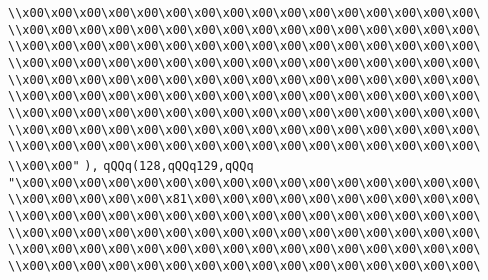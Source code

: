 \verb|\\x00\x00\x00\x00\x00\x00\x00\x00\x00\x00\x00\x00\x00\x00\x00\x00\|\newline
\verb|\\x00\x00\x00\x00\x00\x00\x00\x00\x00\x00\x00\x00\x00\x00\x00\x00\|\newline
\verb|\\x00\x00\x00\x00\x00\x00\x00\x00\x00\x00\x00\x00\x00\x00\x00\x00\|\newline
\verb|\\x00\x00\x00\x00\x00\x00\x00\x00\x00\x00\x00\x00\x00\x00\x00\x00\|\newline
\verb|\\x00\x00\x00\x00\x00\x00\x00\x00\x00\x00\x00\x00\x00\x00\x00\x00\|\newline
\verb|\\x00\x00\x00\x00\x00\x00\x00\x00\x00\x00\x00\x00\x00\x00\x00\x00\|\newline
\verb|\\x00\x00\x00\x00\x00\x00\x00\x00\x00\x00\x00\x00\x00\x00\x00\x00\|\newline
\verb|\\x00\x00\x00\x00\x00\x00\x00\x00\x00\x00\x00\x00\x00\x00\x00\x00\|\newline
\verb|\\x00\x00\x00\x00\x00\x00\x00\x00\x00\x00\x00\x00\x00\x00\x00\x00\|\newline
\verb|\\x00\x00"|\newline
\verb|),|\newline
\verb|qQQq(128,qQQq129,qQQq|\newline
\verb|"\x00\x00\x00\x00\x00\x00\x00\x00\x00\x00\x00\x00\x00\x00\x00\x00\|\newline
\verb|\\x00\x00\x00\x00\x00\x81\x00\x00\x00\x00\x00\x00\x00\x00\x00\x00\|\newline
\verb|\\x00\x00\x00\x00\x00\x00\x00\x00\x00\x00\x00\x00\x00\x00\x00\x00\|\newline
\verb|\\x00\x00\x00\x00\x00\x00\x00\x00\x00\x00\x00\x00\x00\x00\x00\x00\|\newline
\verb|\\x00\x00\x00\x00\x00\x00\x00\x00\x00\x00\x00\x00\x00\x00\x00\x00\|\newline
\verb|\\x00\x00\x00\x00\x00\x00\x00\x00\x00\x00\x00\x00\x00\x00\x00\x00\|\newline
